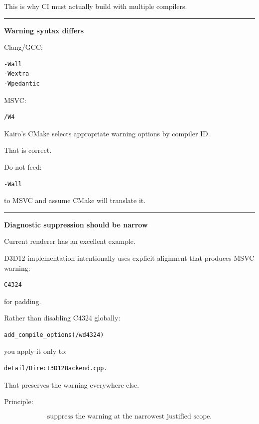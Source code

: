 This is why CI must actually build with multiple compilers.

\begin{center}\rule{0.5\linewidth}{0.5pt}\end{center}

\textbf{Warning syntax differs}

Clang/GCC:

\begin{verbatim}
-Wall
-Wextra
-Wpedantic
\end{verbatim}

MSVC:

\begin{verbatim}
/W4
\end{verbatim}

Kairo's CMake selects appropriate warning options by compiler ID.

That is correct.

Do not feed:

\begin{verbatim}
-Wall
\end{verbatim}

to MSVC and assume CMake will translate it.

\begin{center}\rule{0.5\linewidth}{0.5pt}\end{center}

\textbf{Diagnostic suppression should be narrow}

Current renderer has an excellent example.

D3D12 implementation intentionally uses explicit alignment that produces MSVC warning:

\begin{verbatim}
C4324
\end{verbatim}

for padding.

Rather than disabling C4324 globally:

\begin{verbatim}
add_compile_options(/wd4324)
\end{verbatim}

you apply it only to:

\begin{verbatim}
detail/Direct3D12Backend.cpp.
\end{verbatim}

That preserves the warning everywhere else.

Principle:

\[
\boxed{
\text{suppress the warning at the narrowest justified scope}.
}
\]

